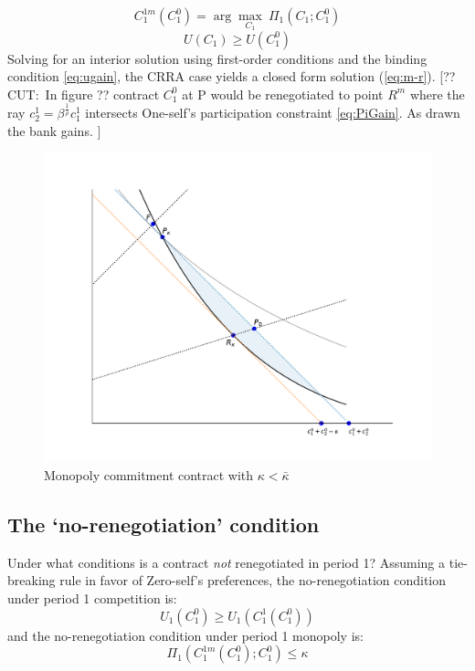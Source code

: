 \documentclass[11pt,english]{article}
\theoremstyle{plain}
\theoremstyle{definition}
\begin{document}
\begin{equation}
C_{1}^{1m}(C_{1}^{0})=\arg\max_{C_{1}}\ \Pi_{1}(C_{1};C_{1}^{0})
\end{equation}
\begin{equation}
U(C_{1})\geq U(C_{1}^{0})\label{eq:ugain}
\end{equation}
Solving for an interior solution using first-order conditions and
the binding condition \ref{eq:ugain}, the CRRA case yields a closed
form solution (\ref{eq:m-r}). [??CUT:\ In figure ?? contract $C_{1}^{0}$
at P would be renegotiated to point $R^{m}$ where the ray $c_{2}^{1}=\beta^{\frac{1}{\rho}}c_{1}^{1}$
intersects One-self's participation constraint \ref{eq:PiGain}. As
drawn the bank gains.
]
\begin{figure}
  \includegraphics[width=1\textwidth]{renegproof.pdf}
  \caption{Monopoly commitment contract with $\kappa<\bar{\kappa}$}
  \label{fig:renegproof} 
\end{figure}


\subsection{The `no-renegotiation' condition}

\label{sec-no-reneg-cond}

Under what conditions is a contract \textit{not} renegotiated in period 1? Assuming a tie-breaking rule in favor of
Zero-self's preferences, the no-renegotiation condition under period
1 competition is: 
\begin{equation}
U_{1}\left(C_{1}^{0}\right)\geq U_{1}\left(C_{1}^{1}(C_{1}^{0})\right)\label{eq:no-reg-comp}
\end{equation}and the no-renegotiation condition under period 1 monopoly is: 
\begin{equation}
\Pi_{1}(C_{1}^{1m}\left(C_{1}^{0}\right);C_{1}^{0})\leq\kappa\label{eq:no-reg-monop}
\end{equation}
\end{document}
